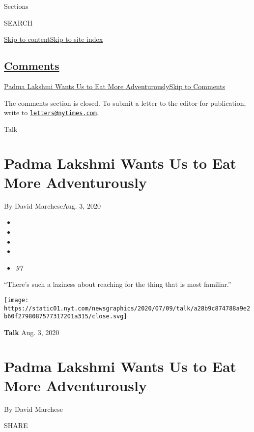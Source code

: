 Sections

SEARCH

\protect\hyperlink{site-content}{Skip to
content}\protect\hyperlink{site-index}{Skip to site index}

\hypertarget{comments}{%
\subsection{\texorpdfstring{\protect\hyperlink{commentsContainer}{Comments}}{Comments}}\label{comments}}

\href{}{Padma Lakshmi Wants Us to Eat More Adventurously}\href{}{Skip to
Comments}

The comments section is closed. To submit a letter to the editor for
publication, write to
\href{mailto:letters@nytimes.com}{\nolinkurl{letters@nytimes.com}}.

Talk

\hypertarget{padma-lakshmi-wants-us-to-eat-more-adventurously}{%
\section{Padma Lakshmi Wants Us to Eat More
Adventurously}\label{padma-lakshmi-wants-us-to-eat-more-adventurously}}

By David MarcheseAug. 3, 2020

\begin{itemize}
\item
\item
\item
\item
\item
  \emph{97}
\end{itemize}

``There's such a laziness about reaching for the thing that is most
familiar.''

\texttt{[image: https://static01.nyt.com/newsgraphics/2020/07/09/talk/a28b9c874788a9e2b60f2798087577317201a315/close.svg]}

\textbf{Talk} Aug. 3, 2020

\hypertarget{padma-lakshmi-wants-us-to-eat-more-adventurously-1}{%
\section{Padma Lakshmi Wants Us to Eat More
Adventurously}\label{padma-lakshmi-wants-us-to-eat-more-adventurously-1}}

By David Marchese

SHARE

